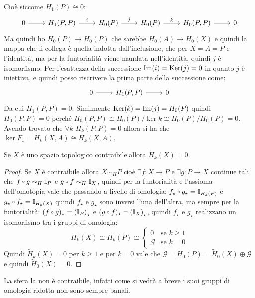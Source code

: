   Cioè siccome $ H_1(P) \cong 0 $:
  \[
    \begin{tikzcd}
       0 \arrow{r}{}         & H_1(P,P) \arrow{r}{i}  & H_{0}(P) \arrow{r}{j}   & H_{0}(P) \arrow{r}{k} & H_{0}(P,P) \rar       & 0
    \end{tikzcd}
  \]
  Ma quindi ho $ H_0(P) \to H_0(P) $ che sarebbe $ H_0(A) \to H_0(X) $ e quindi la
  mappa che li collega è quella indotta dall'inclusione, che per $ X = A = P $ e
  l'identità, ma per la funtorialità viene mandata nell'identità, quindi $ j $ è
  isomorfismo. Per l'esattezza della successione $ \mathrm{Im}( i ) = \mathrm{Ker}( j) = 0 $ in
  quanto $ j $ è iniettiva, e quindi posso riscrivere la prima parte della
  successione come:
  \[
    \begin{tikzcd}
      0 \rar & H_1(P,P) \rar & 0
    \end{tikzcd}
  \]
  Da cui $ H_1(P,P) = 0 $. Similmente $ \mathrm{Ker}( k) = \mathrm{Im}( j ) = H_0(P) $ quindi $ H_0(P,P) = 0 $ perché
  $ H_0(P,P) \cong {H_0(P)} \slash {\ker{k}} \cong {H_0(P)} \slash {H_0(P)} = 0 $.
  Avendo trovato che $ \forall k $ $ H_k(P,P) = 0 $ allora si ha che $ \ker{F_\star} = \tilde{H}_k(X,A) \cong H_k(X,A) $.

\begin{corollary}
  Se $ X $ è uno spazio topologico contraibile allora $ \tilde{H}_k(X) = 0 $.
\end{corollary}
\begin{proof}
  Se $ X $ è contraibile allora $ X \sim_H P $ cioè $ \exists f \colon X \to P $ e $ \exists g \colon P \to X $
  continue tali che $ f \circ g \sim_H \Id{P} $ e $ g \circ f \sim_H \Id{X} $, quindi
  per la funtorialità e l'assioma dell'omotopia vale che passando a livello
  di omologia:
  $ f_\star \circ g_\star = \Id{H_k(P)} $ e  $ g_\star \circ f_\star = \Id{H_k(X)} $
  quindi $ f_\star $ e $ g_\star $ sono inversi l'una dell'altra, ma sempre per la funtorialità:
  $ (f \circ g)_\star = \left( \Id{P} \right)_\star $ e $ (g \circ f)_\star = \left( \Id{X} \right)_\star $,
  quindi $ f_\star $ e $ g_\star $ realizzano un isomorfismo tra i gruppi di omologia:
  \[
   H_k(X) \cong H_k(P) \cong
    \begin{cases}
      0 & \text{se } k \geq 1 \\
      \mathcal{G} & \text{se } k = 0
    \end{cases}
  \]
  Quindi $ \tilde{H}_k(X) = 0 $ per $ k \geq 1 $ e per $ k = 0 $ vale che
  $ \mathcal{G} = H_0(P) = \tilde{H}_0(X) \oplus \mathcal{G} $ e quindi
  $ \tilde{H}_0(X) = 0 $.
\end{proof}
\begin{corollary}
  La sfera la non è contraibile, infatti come si vedrà a breve i suoi gruppi di
  omologia ridotta non sono sempre banali.
\end{corollary}

